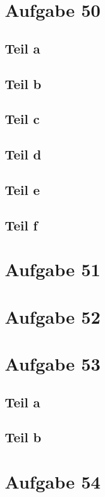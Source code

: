 \documentclass[10pt,a4paper]{article}
\begin{document}
\section{Aufgabe 50}

\subsection{Teil a}

\subsection{Teil b}

\subsection{Teil c}

\subsection{Teil d}

\subsection{Teil e}

\subsection{Teil f}

\section{Aufgabe 51}

\section{Aufgabe 52}

\section{Aufgabe 53}

\subsection{Teil a}

\subsection{Teil b}

\section{Aufgabe 54}
\end{document}
